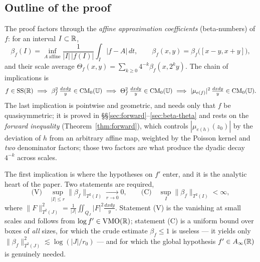 \subsection{Outline of the proof}\label{ss:outline}

The proof factors through the \emph{affine approximation coefficients}
(beta-numbers) of $f$: for an interval $I\subset\mathbb{R}$,
\[
\beta_f(I)=\inf_{A\ \text{affine}}\frac1{|I|\,|f(I)|}\int_I|f-A|\,dt,
\qquad
\beta_f(x,y)=\beta_f\bigl([x-y,x+y]\bigr),
\]
and their scale average $\Theta_f(x,y)=\sum_{k\ge0}4^{-k}\beta_f(x,2^ky)$. The
chain of implications is
\[
f\in\mathrm{SS}(\mathbb{R})
\ \Longrightarrow\
\beta_f^2\,\tfrac{dxdy}{y}\in\mathrm{CM}_0(\mathbb{U})
\ \Longrightarrow\
\Theta_f^2\,\tfrac{dxdy}{y}\in\mathrm{CM}_0(\mathbb{U})
\ \Longrightarrow\
|\mu_{e(f)}|^2\,\tfrac{dxdy}{y}\in\mathrm{CM}_0(\mathbb{U}).
\]
The last implication is pointwise and geometric, and needs only that $f$ be
quasisymmetric; it is proved in \S\S\ref{sec:forward}--\ref{sec:beta-theta} and
rests on the \emph{forward inequality} (Theorem~\ref{thm:forward}), which
controls $|\mu_{e(h)}(z_0)|$ by the deviation of $h$ from an arbitrary affine
map, weighted by the Poisson kernel and \emph{two} denominator factors; those
two factors are what produce the dyadic decay $4^{-k}$ across scales.

The first implication is where the hypotheses on $f'$ enter, and it is the
analytic heart of the paper. Two statements are required,
\begin{equation}\label{eq:two-inputs}
	\text{(V)}\quad \sup_{|I|\le r}\|\beta_f\|_{T^2(I)}\xrightarrow[r\to0]{}0,
	\qquad
	\text{(C)}\quad \sup_{I}\|\beta_f\|_{T^2(I)}<\infty ,
\end{equation}
where $\|F\|_{T^2(J)}^2=\frac1{|J|}\iint_{Q_J}|F|^2\frac{dxdy}{y}$. Statement
(V) is the vanishing at small scales and follows from $\log f'\in\mathrm{VMO}(\mathbb{R})$;
statement (C) is a uniform bound over boxes of \emph{all} sizes, for which the
crude estimate $\beta_f\le1$ is useless --- it yields only
$\|\beta_f\|_{T^2(J)}^2\lesssim\log(|J|/r_0)$ --- and for which the global
hypothesis $f'\in A_\infty(\mathbb{R})$ is genuinely needed.

